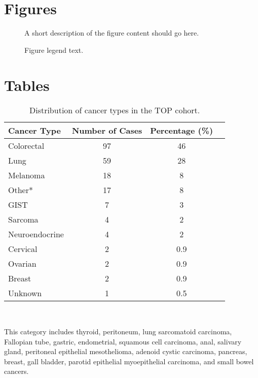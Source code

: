 \documentclass{bmcart}
\begin{document}
\begin{backmatter}

\section*{Figures}
  \begin{figure}[h!]
  \caption{
      A short description of the figure content
      should go here.}
      \end{figure}

\begin{figure}[h!]
  \caption{
      Figure legend text.}
      \end{figure}


\section*{Tables}

\begin{table}[H]
\caption{Distribution of cancer types in the TOP cohort.}\label{cancertypes}
      \begin{tabular}{lccc}
        \hline
        Cancer Type & Number of Cases & Percentage (\%) \\ \hline
        Colorectal & 97 & 46 \\
        Lung & 59 & 28 \\
        Melanoma & 18 & 8 \\
				Other* & 17 & 8 \\
				GIST & 7 & 3 \\
				Sarcoma & 4 & 2 \\
				Neuroendocrine & 4 & 2 \\
				Cervical & 2 & 0.9 \\
				Ovarian & 2 & 0.9 \\
				Breast & 2 & 0.9 \\
				Unknown & 1 & 0.5 \\ \hline
      \end{tabular} \\
\raggedright
{\small *This category includes thyroid, peritoneum, lung sarcomatoid carcinoma, Fallopian tube, gastric, endometrial, squamous cell carcinoma, anal, salivary gland, peritoneal epithelial mesothelioma, adenoid cystic carcinoma, pancreas, breast, gall bladder, parotid epithelial myoepithelial carcinoma, and small bowel cancers.}
\end{table}


\end{backmatter}
\end{document}

